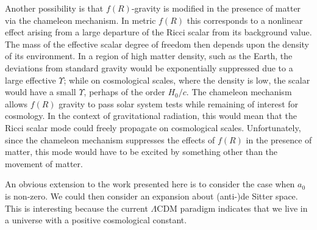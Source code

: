 Another possibility is that $f(R)$-gravity is modified in the presence of matter via the chameleon mechanism\cite{Khoury2004, Khoury2004a}. In metric $f(R)$ this corresponds to a nonlinear effect arising from a large departure of the Ricci scalar from its background value\cite{DeFelice2010}. The mass of the effective scalar degree of freedom then depends upon the density of its environment. In a region of high matter density, such as the Earth, the deviations from standard gravity would be exponentially suppressed due to a large effective $\Upsilon$; while on cosmological scales, where the density is low, the scalar would have a small $\Upsilon$, perhaps of the order $H_0/c$\cite{Khoury2004, Khoury2004a}. The chameleon mechanism allows $f(R)$ gravity to pass solar system tests while remaining of interest for cosmology. In the context of gravitational radiation, this would mean that the Ricci scalar mode could freely propagate on cosmological scales\cite{Corda2009}. Unfortunately, since the chameleon mechanism suppresses the effects of $f(R)$ in the presence of matter, this mode would have to be excited by something other than the movement of matter.

An obvious extension to the work presented here is to consider the case when $a_0$ is non-zero. We could then consider an expansion about (anti-)de Sitter space. This is interesting because the current $\Lambda$CDM paradigm indicates that we live in a universe with a positive cosmological constant\cite{Hinshaw2009}. 
